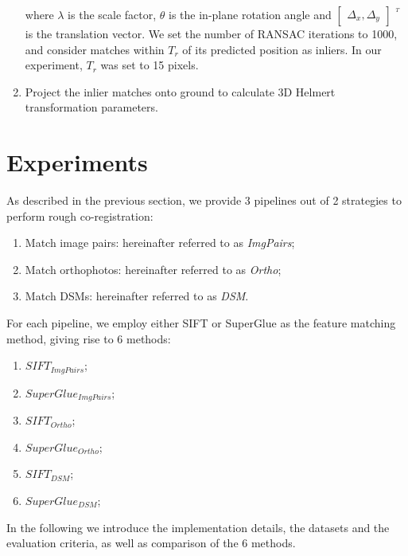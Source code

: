 \begin{enumerate}
    where $\lambda$ is the scale factor, $\theta$ is the in-plane rotation angle and $\left [ \begin{array}{c}
    \Delta_x, \Delta_y
    \end{array}
    \right ]$ $^{^T}$ is the translation vector.
    We set the number of RANSAC iterations to 1000, and consider matches within $T_r$ of its predicted position as inliers. In our experiment, {$T_r$ was set to 15 pixels.}
    \item Project the inlier matches onto ground to calculate 3D Helmert transformation parameters.
\end{enumerate}





\section{Experiments}
As described in the previous section, we provide 3 pipelines out of 2 strategies to perform rough co-registration:\\
\begin{enumerate}
    \item Match image pairs: hereinafter referred to as \textit{ImgPairs};
    \item Match orthophotos: hereinafter referred to as \textit{Ortho};
    \item Match DSMs: hereinafter referred to as \textit{DSM}.
\end{enumerate}
For each pipeline, we employ either SIFT or SuperGlue as the feature matching method, giving rise to 6 methods:\\
\begin{enumerate}
    \item $SIFT_{ImgPairs}$;
    \item $SuperGlue_{ImgPairs}$;
    \item $SIFT_{Ortho}$;
    \item $SuperGlue_{Ortho}$;
    \item $SIFT_{DSM}$;
    \item $SuperGlue_{DSM}$;
\end{enumerate}
In the following we introduce the implementation details, the datasets and the evaluation criteria, as well as comparison of the 6 methods.\\

